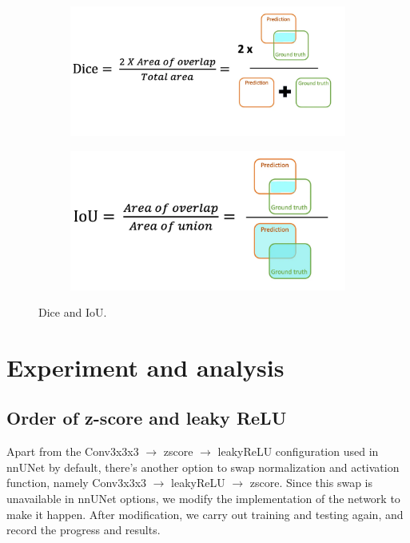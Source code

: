 \documentclass{article}
\begin{document}
\begin{figure}
  \centering
  \begin{subfigure}{0.49\textwidth}
    \includegraphics[width=\textwidth]{./figs/dice.png}
  \end{subfigure}
  \begin{subfigure}{0.49\textwidth}
    \includegraphics[width=\textwidth]{./figs/iou.png}
  \end{subfigure}
  \caption{Dice and IoU.}
  \label{diceiou}
\end{figure}

\section{Experiment and analysis}

\subsection{Order of z-score and leaky ReLU}

Apart from the Conv3x3x3 \(\rightarrow\) zscore \(\rightarrow\) leakyReLU configuration used in nnUNet by default, there's another option to swap normalization and activation function, namely Conv3x3x3 \(\rightarrow\) leakyReLU \(\rightarrow\) zscore. Since this swap is unavailable in nnUNet options, we modify the implementation of the network to make it happen. After modification, we carry out training and testing again, and record the progress and results.
\end{document}
